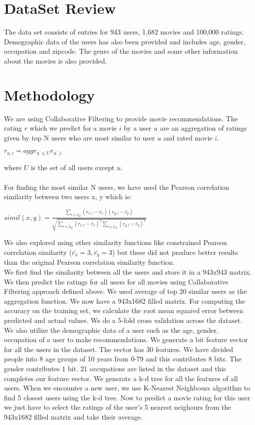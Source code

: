 \documentclass[pdftex,12pt,a4paper]{article}
\begin{document}
	\section{DataSet Review}
		The data set consists of entries for 943 users, 1,682 movies and 100,000 ratings. Demographic data of the users has also been provided and includes age, gender, occupation and zipcode. The genre of the movies and some other information about the movies is also provided.
	
	\section{Methodology}
		We are using Collaborative Filtering to provide movie recommendations. The rating $r$ which we predict for a movie $i$ by a user $u$ are an aggregation of ratings given by top N users who are most similar to user $u$ and rated movie $i$.
		\begin{center}
			$r_{u,i} = aggr_{u^\prime \in U} r_{u^\prime, i}$
		\end{center}
		where $U$ is the set of all users except $u$.\\\\
		For finding the most similar N users, we have used the Pearson correlation similarity between two users x, y which is:
		\begin{center}
			$simil(x,y) = \frac{\sum\limits_{i \in I_{xy}}(r_{x,i}-\bar{r_x})(r_{y,i}-\bar{r_y})}{\sqrt{\sum\limits_{i \in I_{xy}}(r_{x,i}-\bar{r_x})^2\sum\limits_{i \in I_{xy}}(r_{y,i}-\bar{r_y})^2}}$
		\end{center}
		We also explored using other similarity functions like constrained Pearson correlation similarity ($\bar{r_x}=3, \bar{r_y}=3$) but these did not produce better results than the original Pearson correlation similarity function.\\

		We first find the similarity between all the users and store it in a 943x943 matrix. We then predict the ratings for all users for all movies using Collaborative Filtering approach defined above. We used average of top 20 similar users as the aggregation function. We now have a 943x1682 filled matrix. For computing the accuracy on the training set, we calculate the root mean squared error between predicted and actual values. We do a 5-fold cross validation across the dataset.\\

		We also utilize the demographic data of a user such as the age, gender, occupation of a user to make recommendations. We generate a bit feature vector for all the users in the dataset. The vector has 30 features. We have divided people into 8 age groups of 10 years from 0-79 and this contributes 8 bits. The gender contributes 1 bit. 21 occupations are listed in the dataset and this completes our feature vector. We generate a k-d tree for all the features of all users. When we encounter a new user, we use K-Nearest Neighbours algorithm to find 5 closest users using the k-d tree. Now to predict a movie rating for this user we just have to select the ratings of the user's 5 nearest neighours from the 943x1682 filled matrix and take their average.\\
\end{document}
